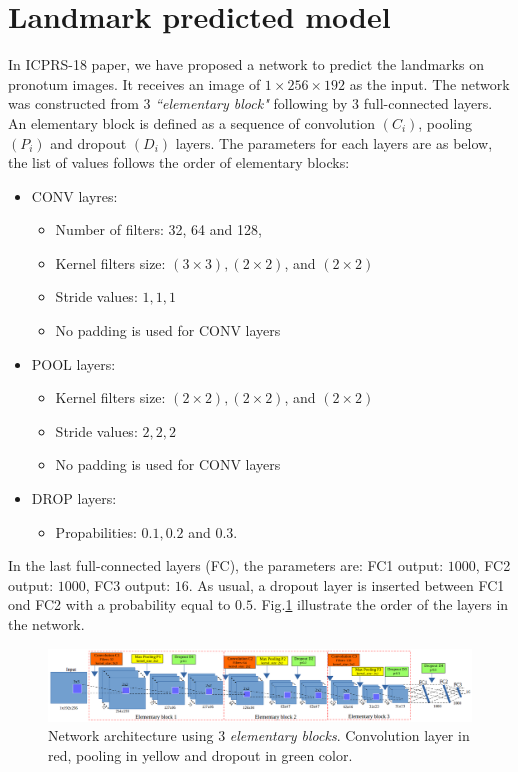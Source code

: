 \documentclass[12pt,a4paper]{article}
\begin{document}
\section{Landmark predicted model}
In ICPRS-18 paper, we have proposed a network to predict the landmarks on pronotum images. It receives an image of $1 \times 256 \times 192$ as the input. The network was constructed from $3$ \textit{``elementary block"} following by $3$ full-connected layers. An elementary block is defined as a sequence of convolution $(C_i)$, pooling $(P_i)$ and dropout $(D_i)$ layers. The parameters for each layers are as below, the list of values follows the order of elementary blocks:
\begin{itemize}[nosep,label=\footnotesize$\bullet$]
	\item CONV layres:
	\begin{itemize}[nosep]
		\item Number of filters: 32, 64 and 128,
		\item Kernel filters size: $(3 \times 3), (2 \times 2)$, and $(2 \times 2)$
		\item Stride values: $1,1,1$
		\item No padding is used for CONV layers
	\end{itemize}
	\item POOL layers:
	\begin{itemize}[nosep]
		\item Kernel filters size: $(2 \times 2), (2 \times 2)$, and $(2 \times 2)$
		\item Stride values: $2,2,2$
		\item No padding is used for CONV layers
	\end{itemize}
	\item DROP layers:
	\begin{itemize}
		\item Propabilities: $0.1, 0.2$ and $0.3$.
	\end{itemize}
\end{itemize}
In the last full-connected layers (FC), the parameters are: FC1
output: $1000$, FC2 output: $1000$, FC3 output: $16$. As usual, a
dropout layer is inserted between FC1 ond FC2 with a probability equal to $0.5$. Fig.\ref{cnnnetwork2} illustrate the order of the layers in the network.

\begin{figure}[h]
\centering
\includegraphics[scale=0.32]{images/cnn_newdatasize/arch_model}
\caption{{\small{Network architecture using $3$ \textit{elementary blocks}.
  Convolution
  layer in red, pooling in yellow and dropout in green color.}}} 
\label{cnnnetwork2}
\end{figure}
\end{document}
